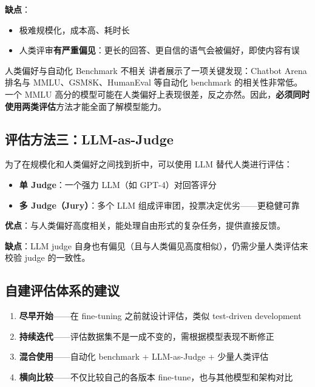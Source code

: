 \textbf{缺点}：
\begin{itemize}
    \item 极难规模化，成本高、耗时长
    \item 人类评审\textbf{有严重偏见}：更长的回答、更自信的语气会被偏好，即使内容有误
\end{itemize}

\begin{warningbox}{人类偏好与自动化 Benchmark 不相关}
讲者展示了一项关键发现：Chatbot Arena 排名与 MMLU、GSM8K、HumanEval 等自动化 benchmark 的相关性非常低。一个 MMLU 高分的模型可能在人类偏好上表现很差，反之亦然。因此，\textbf{必须同时使用两类评估}方法才能全面了解模型能力。
\end{warningbox}

\subsection{评估方法三：LLM-as-Judge}

为了在规模化和人类偏好之间找到折中，可以使用 LLM 替代人类进行评估：

\begin{itemize}
    \item \textbf{单 Judge}：一个强力 LLM（如 GPT-4）对回答评分
    \item \textbf{多 Judge（Jury）}：多个 LLM 组成评审团，投票决定优劣——更稳健可靠
\end{itemize}

\textbf{优点}：与人类偏好高度相关，能处理自由形式的复杂任务，提供直接反馈。

\textbf{缺点}：LLM judge 自身也有偏见（且与人类偏见高度相似），仍需少量人类评估来校验 judge 的一致性。

\subsection{自建评估体系的建议}

\begin{enumerate}
    \item \textbf{尽早开始}——在 fine-tuning 之前就设计评估，类似 test-driven development
    \item \textbf{持续迭代}——评估数据集不是一成不变的，需根据模型表现不断修正
    \item \textbf{混合使用}——自动化 benchmark + LLM-as-Judge + 少量人类评估
    \item \textbf{横向比较}——不仅比较自己的各版本 fine-tune，也与其他模型和架构对比
\end{enumerate}

